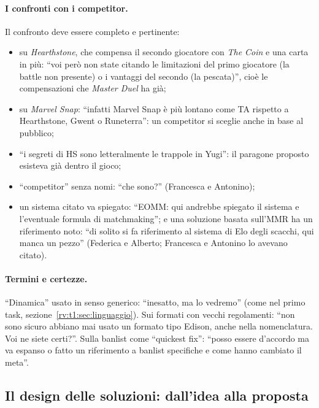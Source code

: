 \paragraph{I confronti con i competitor.} Il confronto deve essere completo e
pertinente:
\begin{itemize}
  \item su \emph{Hearthstone}, che compensa il secondo giocatore con \emph{The
        Coin} e una carta in più: ``voi però non state citando le limitazioni
        del primo giocatore (la battle non presente) o i vantaggi del secondo
        (la pescata)'', cioè le compensazioni che \emph{Master Duel} ha già;
  \item su \emph{Marvel Snap}: ``infatti Marvel Snap è più lontano come TA
        rispetto a Hearthstone, Gwent o Runeterra'': un competitor si sceglie
        anche in base al pubblico;
  \item ``i segreti di HS sono letteralmente le trappole in Yugi'': il
        paragone proposto esisteva già dentro il gioco;
  \item ``competitor'' senza nomi: ``che sono?'' (Francesca e Antonino);
  \item un sistema citato va spiegato: ``EOMM: qui andrebbe spiegato il
        sistema e l'eventuale formula di matchmaking''; e una soluzione
        basata sull'MMR ha un riferimento noto: ``di solito si fa riferimento
        al sistema di Elo degli scacchi, qui manca un pezzo'' (Federica e
        Alberto; Francesca e Antonino lo avevano citato).
\end{itemize}

\paragraph{Termini e certezze.} ``Dinamica'' usato in senso generico:
``inesatto, ma lo vedremo'' (come nel primo task, sezione~\ref{rv:t1:sec:linguaggio}).
Sui formati con vecchi regolamenti: ``non sono sicuro abbiano mai usato un
formato tipo Edison, anche nella nomenclatura. Voi ne siete certi?''. Sulla
banlist come ``quickest fix'': ``posso essere d'accordo ma va espanso o fatto
un riferimento a banlist specifiche e come hanno cambiato il meta''.

\subsection{Il design delle soluzioni: dall'idea alla proposta}
\label{rv:t3:sec:design}

